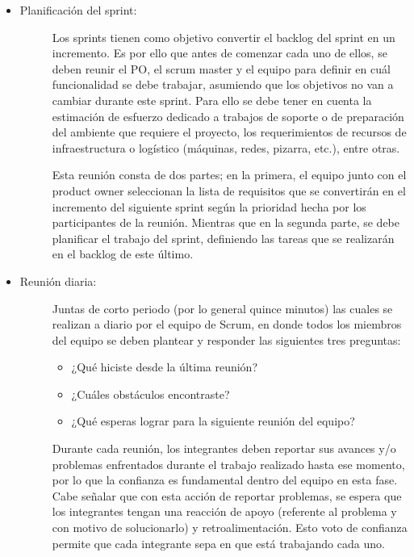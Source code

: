 \begin{itemize}
    \item   \begin{description}
                \item[Planificación del sprint: ] Los sprints tienen como objetivo convertir el back\-log del sprint en un incremento. Es por ello que antes de comenzar cada uno de ellos, se deben reunir el PO, el scrum master y el equipo para definir en cuál funcionalidad se debe trabajar, asumiendo que los objetivos no van a cambiar durante este sprint. Para ello se debe tener en cuenta la estimación de esfuerzo dedicado a trabajos de soporte o de preparación del ambiente que requiere el proyecto, los requerimientos de recursos de infraestructura o logístico (máquinas, redes, pizarra, etc.), entre otras.
                
                Esta reunión consta de dos partes; en la primera, el equipo junto con el product owner seleccionan la lista de requisitos que se convertirán en el incremento del siguiente sprint según la prioridad hecha por los participantes de la reunión. Mientras que en la segunda parte, se debe planificar el trabajo del sprint, definiendo las tareas que se realizarán en el backlog de este último.

            \end{description}

    \item   \begin{description}
                \item[Reunión diaria:] Juntas de corto periodo (por lo general quince minutos) las cuales se realizan a diario por el equipo de Scrum, en donde todos los miembros del equipo se deben plantear y responder las siguientes tres preguntas:  
                
                \begin{itemize}
                    \item ¿Qué hiciste desde la última reunión?

                    \item ¿Cuáles obstáculos encontraste? 

                    \item ¿Qué esperas lograr para la siguiente reunión del equipo?
                \end{itemize}

                Durante cada reunión, los integrantes deben reportar sus avances y/o problemas enfrentados durante el trabajo realizado hasta ese momento, por lo que la confianza es fundamental dentro del equipo en esta fase. Cabe señalar que con esta acción de reportar problemas, se espera que los integrantes tengan una reacción de apoyo (referente al problema y con motivo de solucionarlo) y retroalimentación. Esto voto de confianza permite que cada integrante sepa en que está trabajando cada uno.
            \end{description}
    

\end{itemize}
